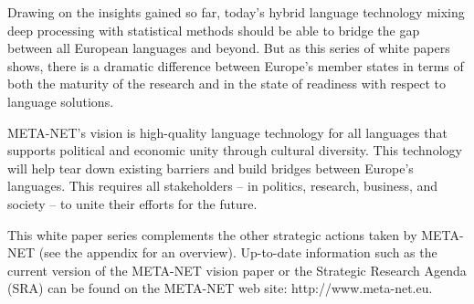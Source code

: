 \begin{multicols}{2}

Drawing on the insights gained so far, today’s hybrid language technology mixing deep processing with statistical methods should be able to bridge the gap between all European languages and beyond. But as this series of white papers shows, there is a dramatic difference between Europe’s member states in terms of both the maturity of the research and in the state of readiness with respect to language solutions. 

META-NET’s vision is high-quality language technology for all languages that supports political and economic unity through cultural diversity. This technology will help tear down existing barriers and build bridges between Europe’s languages. This requires all stakeholders -- in politics, research, business, and society -- to unite their efforts for the future.

This white paper series complements the other strategic actions taken by META-NET (see the appendix for an overview). Up-to-date information such as the current version of the META-NET vision paper \cite{Meta1} or the Strategic Research Agenda (SRA) can be found on the META-NET web site: http://www.meta-net.eu.
\end{multicols}

\clearpage


